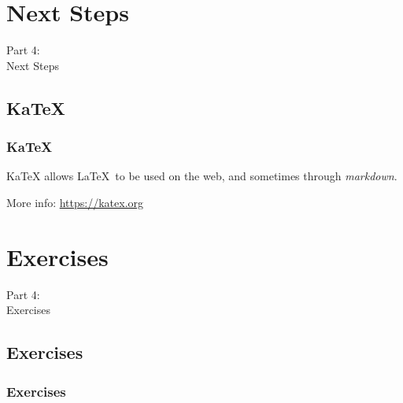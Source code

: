 {
\renewcommand{\bgcolor}{next}

\section{Next Steps}
\begin{frame}
  \vspace{25mm}
  \begin{center}
    \Huge{Part 4:\\Next Steps}
  \end{center}
\end{frame}

\subsection{KaTeX}
\begin{frame}[fragile]
  \frametitle{KaTeX}
  \vspace{3mm}
  KaTeX allows \LaTeX\ to be used on the web, and sometimes through \textsl{markdown}.
  
  \vspace{5mm}
  More info: \url{https://katex.org}
\end{frame}

}


{
\renewcommand{\bgcolor}{exercises}

\section{Exercises}
\begin{frame}
  \vspace{25mm}
  \begin{center}
    \Huge{Part 4:\\Exercises}
  \end{center}
\end{frame}

\subsection{Exercises}
\begin{frame}[fragile]
  \frametitle{Exercises}
  \vspace{3mm}
  \begin{enumerate}
  \end{enumerate}
\end{frame}

}

